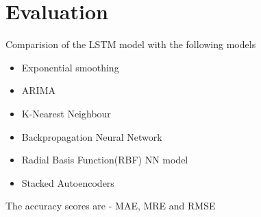 \section{Evaluation}

Comparision of the LSTM model with the following models

\begin{itemize}
\item Exponential smoothing
\item ARIMA
\item K-Nearest Neighbour
\item Backpropagation Neural Network
\item Radial Basis Function(RBF) NN model
\item Stacked Autoencoders
\end{itemize}

The accuracy scores are - MAE, MRE and RMSE